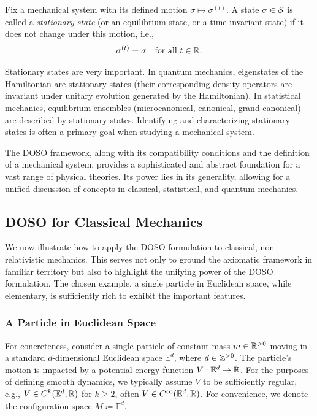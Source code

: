 \begin{definition} \label{def:1.15}
Fix a mechanical system with its defined motion $\sigma \mapsto \sigma^{(t)}$. A state $\sigma \in \mathcal{S}$ is called a \emph{stationary state} (or an equilibrium state, or a time-invariant state) if it does not change under this motion, i.e.,
\[ \sigma^{(t)} = \sigma \quad \text{for all } t \in \mathbb{R}. \]
\end{definition}

Stationary states are very important. In quantum mechanics, eigenstates of the Hamiltonian are stationary states (their corresponding density operators are invariant under unitary evolution generated by the Hamiltonian). In statistical mechanics, equilibrium ensembles (microcanonical, canonical, grand canonical) are described by stationary states. Identifying and characterizing stationary states is often a primary goal when studying a mechanical system.

\begin{remark}
    The DOSO framework, along with its compatibility conditions and the definition of a mechanical system, provides a sophisticated and abstract foundation for a vast range of physical theories. Its power lies in its generality, allowing for a unified discussion of concepts in classical, statistical, and quantum mechanics.
\end{remark}


\subsection{DOSO for Classical Mechanics}

We now illustrate how to apply the DOSO formulation to classical, non-relativistic mechanics. This serves not only to ground the axiomatic framework in familiar territory but also to highlight the unifying power of the DOSO formulation. The chosen example, a single particle in Euclidean space, while elementary, is sufficiently rich to exhibit the important features.

\subsubsection{A Particle in Euclidean Space}

For concreteness, consider a single particle of constant mass $m \in \mathbb{R}^{>0}$ moving in a standard $d$-dimensional Euclidean space $\mathbb{E}^d$, where $d \in \mathbb{Z}^{>0}$. The particle's motion is impacted by a potential energy function $V: \mathbb{E}^d \to \mathbb{R}$. For the purposes of defining smooth dynamics, we typically assume $V$ to be sufficiently regular, e.g., $V \in C^k(\mathbb{E}^d, \mathbb{R})$ for $k \ge 2$, often $V \in C^\infty(\mathbb{E}^d, \mathbb{R})$. For convenience, we denote the configuration space $M \coloneqq \mathbb{E}^d$.

